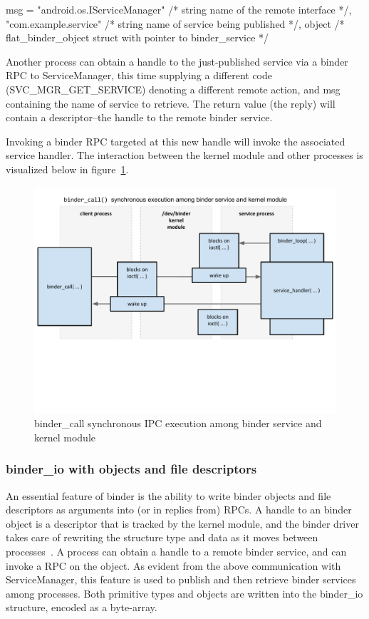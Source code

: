 \documentclass[prodmode]{acmlarge}
\begin{document}
\begin{snippet}[caption=contents of msg passed into binder\_call]
msg = {
  "android.os.IServiceManager" /* string name of the remote interface */,
  "com.example.service" /* string name of service being published */,
  object /* flat_binder_object struct with pointer to binder_service */
}
\end{snippet}

Another process can obtain a handle to the just-published service via a binder RPC to ServiceManager, this time supplying a different code (SVC\_MGR\_GET\_SERVICE) denoting a different remote action, and msg containing the name of service to retrieve. The return value (the reply) will contain a descriptor--the handle to the remote binder service.

Invoking a binder RPC targeted at this new handle will invoke the associated service handler. The interaction between the kernel module and other processes is visualized below in figure~\ref{fig:binder_call}.

\begin{figure}[h]
\centering
\includegraphics[width=\textwidth]{drawings/binder_call.pdf}
\caption{binder\_call synchronous IPC execution among binder service and kernel module}
\label{fig:binder_call}
\end{figure}

\subsubsection{binder\_io with objects and file descriptors}
An essential feature of binder is the ability to write binder objects and file descriptors as arguments into (or in replies from) RPCs. A handle to an binder object is a descriptor that is tracked by the kernel module, and the binder driver takes care of rewriting the structure type and data as it moves between processes~\cite{BinderSourceComment}. A process can obtain a handle to a remote binder service, and can invoke a RPC on the object. As evident from the above communication with ServiceManager, this feature is used to publish and then retrieve binder services among processes. Both primitive types and objects are written into the binder\_io structure, encoded as a byte-array.
\end{document}

